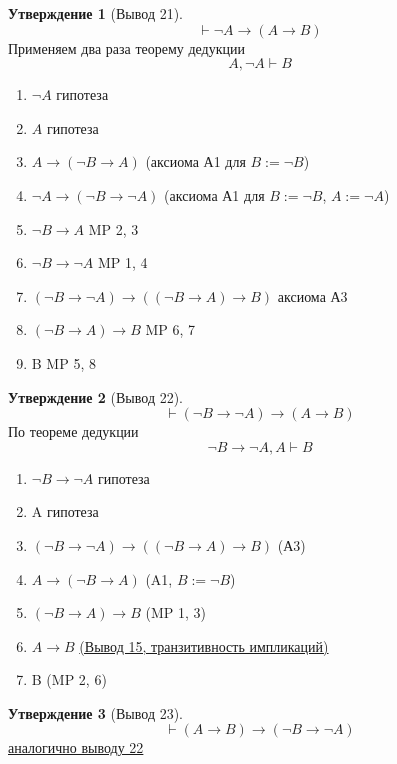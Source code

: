 \documentclass[a4paper]{article}
\theoremstyle{definition}
\newtheorem*{statement}{Утверждение}
\theoremstyle{remark}
\begin{document}
    \begin{statement}[\hypertarget{Вывод 21}{Вывод 21}] 
        $$\vdash \neg A \to (A\to B)$$
        Применяем два раза теорему дедукции
        $$A, \neg A\vdash B$$
        \begin{enumerate}
            \item $\neg A$ гипотеза
            \item $A$ гипотеза
            \item $A\to (\neg B \to A)$ (аксиома А1 для $B := \neg B$)
            \item $\neg A \to (\neg B \to \neg A)$ (аксиома А1 для $B := \neg B$, $A := \neg A$)
            \item $\neg B \to A$ MP 2, 3
            \item $\neg B \to \neg A$ MP 1, 4
            \item $(\neg B \to \neg A) \to ((\neg B \to A) \to B)$ аксиома А3
            \item $(\neg B \to A)\to B$ MP 6, 7
            \item B MP 5, 8
        \end{enumerate}
    \end{statement}
    \begin{statement}[\hypertarget{Вывод 22}{Вывод 22}]
        $$\vdash (\neg B \to \neg A) \to (A\to B)$$
        По теореме дедукции 
        $$\neg B\to \neg A, A\vdash B$$
        \begin{enumerate}
            \item $\neg B\to \neg A$ гипотеза
            \item A гипотеза
            \item $(\neg B \to \neg A)\to ((\neg B \to A) \to B)$ (А3)
            \item $A\to (\neg B \to A)$ (A1, $B := \neg B$)
            \item $(\neg B \to A) \to B$ (MP 1, 3)
            \item $A\to B$ \hyperlink{Вывод 15}{(Вывод 15, транзитивность импликаций)}
            \item B (MP 2, 6)
        \end{enumerate}
    \end{statement}
    \begin{statement}[\hypertarget{Вывод 23}{Вывод 23}] 
        $$\vdash (A \to B) \to (\neg B\to \neg A)$$
        \hyperlink{Вывод 22}{аналогично выводу 22}
    \end{statement}  
\end{document}
